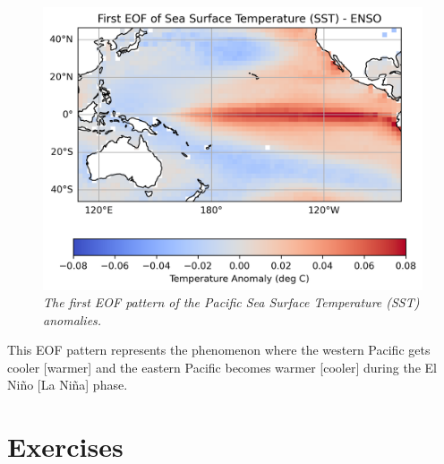 \begin{figure}[h!]
\centering
\includegraphics[scale=0.75]{graphics/SST_EOF.png}
\caption{\textit{The first EOF pattern of the Pacific Sea Surface Temperature (SST) anomalies.}}
\label{fig:ENSOEOF}
\end{figure}
This EOF pattern represents the  phenomenon where the western Pacific gets cooler [warmer] and the eastern Pacific becomes warmer [cooler] during the El Niño [La Niña] phase.

\section{Exercises}

